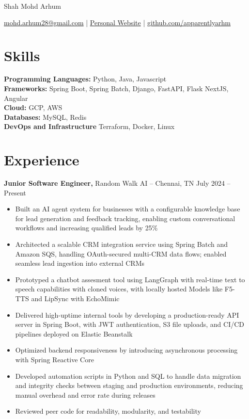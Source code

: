 \documentclass[11pt]{article}       %
\begin{document}
\centerline{\Huge Shah Mohd Arhum}

\vspace{5pt}

\centerline{\href{mailto:mohd.arhum28@gmail.com}{mohd.arhum28@gmail.com} | \href{https://apparentlyarhm.github.io/notaportfolio/}{Personal Website} | \href{https://github.com/apparentlyarhm}{github.com/apparentlyarhm}}

\vspace{-10pt}

\section*{Skills}
\textbf{Programming Languages:} Python, Java, Javascript \\
\textbf{Frameworks:} Spring Boot, Spring Batch, Django, FastAPI, Flask NextJS, Angular \\
\textbf{Cloud:} GCP, AWS \\
\textbf{Databases:} MySQL, Redis \\
\textbf{DevOps and Infrastructure} Terraform, Docker, Linux

\vspace{-6.5pt}

\section*{Experience}
\textbf{Junior Software Engineer,} {Random Walk AI} -- Chennai, TN \hfill July 2024 -- Present \\
\vspace{-9pt}
\begin{itemize}
    \item Built an AI agent system for businesses with a configurable knowledge base for lead generation and feedback tracking, enabling custom conversational workflows and increasing qualified leads by 25\%
    \item Architected a scalable CRM integration service using Spring Batch and Amazon SQS, handling OAuth-secured multi-CRM data flows; enabled seamless lead ingestion into external CRMs
    \item Prototyped a chatbot assesment tool using LangGraph with real-time text to speech capabilities with cloned voices, with locally hosted Models like F5-TTS and LipSync with EchoMimic
    \item Delivered high-uptime internal tools by developing a production-ready API server in Spring Boot, with JWT authentication, S3 file uploads, and CI/CD pipelines deployed on Elastic Beanstalk    \item Optimized backend responsiveness by introducing asynchronous processing with Spring Reactive Core 
    \item Developed automation scripts in Python and SQL to handle data migration and integrity checks between staging and production environments, reducing manual overhead and error rate during releases
    \item Reviewed peer code for readability, modularity, and testability

\end{itemize}
\end{document}
